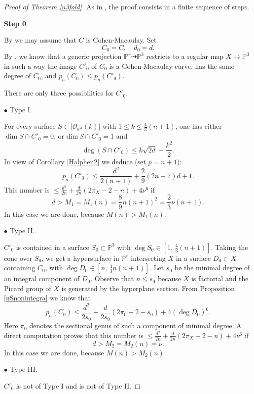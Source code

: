 \documentclass[9pt,a4paper]{amsart}
\theoremstyle{plain}
\theoremstyle{definition}
\theoremstyle{remark}
\begin{document}
\smallskip
\begin{proof}[Proof of Theorem \ref{n3fold}] As in \cite[Proof of Theorem 4.9]{Liu}, the
proof consists in a finite sequence of steps.

\smallskip
{\bf{Step 0}}.

\smallskip
By \cite[Lemma 4.3]{Liu2} we may assume that $C$ is Cohen-Macaulay.
Set
$$
C_0=C, \quad d_0=d.
$$
By \cite[Section 3 and Lemma 3.14]{Liu}, we know that a generic
projection $\mathbb P^r\dasharrow\mathbb P^3$ restricts to a regular
map $X\to \mathbb P^3$ in such a way the image $C'_0$ of $C_0$ is a
Cohen-Macaulay curve, has the same degree of $C_0$, and
$p_a(C_0)\leq p_a(C'_0)$.

\smallskip
There are only three possibilities for $C'_0$.


\smallskip
$\bullet$ Type I.

\smallskip
For every surface $S \in \vert \mathcal{O}_{\mathbb{P}^3}(k) \vert$
with $1\leq k\leq \frac{4}{3}(n+1)$, one has either $\dim S\cap
C'_0=0$, or $\mathrm{dim}\ S\cap C'_0 = 1$ and
$$
\deg(S\cap C'_0) \leq k\sqrt{2d}-\dfrac{k^2}{2}.
$$
In view of  Corollary \ref{Halphen2} we deduce (set $p=n+1$):
$$
p_a(C'_0)\leq \frac{d^2}{2(n+1)}+\frac{2}{9}(2n-7)d+1.
$$
This number is $\leq \frac{d^2}{2n}+\frac{d}{2n}(2\pi_X-2-n)+4\nu^6$
if
$$
d>M_1=M_1(n)=\frac{8}{9}n(n+1)^2=\frac{2}{3}\nu(n+1).
$$
In this case we are done, because $M(n)>M_1(n)$.


\smallskip
$\bullet$ Type II.

\smallskip
$C'_0$ is contained in a surface  $S_0\subset \mathbb P^3$ with
$\deg S_0\in [1,\,\frac{4}{3}(n+1)]$. Taking the cone over $S_0$, we get a hypersurface
in $\mathbb P^r$ intersecting $X$ in a
surface $D_0\subset X$ containing $C_0$, with $\deg D_0\in
[n,\,\frac{4}{3}n(n+1)]$. Let
$s_0$ be the minimal degree of an integral component of $D_0$.
Observe that $n\leq s_0$ because $X$ is factorial and the Picard
group of $X$ is generated by the hyperplane section. From
Proposition \ref{nSnonintegra} we know that
$$
p_a(C_0)\leq \frac{d^2}{2s_0}+\frac{d}{2s_0}(2\pi_0-2-s_0)+4(\deg
D_0)^6.
$$
Here $\pi_0$ denotes the sectional genus of such a component of
minimal degree. A direct computation proves that this number is
$\leq \frac{d^2}{2n}+\frac{d}{2n}(2\pi_X-2-n)+4\nu^6$ if
$$
d>M_2=M_2(n)=\nu.
$$
In this case we are done, because $M(n)>M_2(n)$.


\smallskip
$\bullet$ Type III.

\smallskip
$C'_0$ is not of Type I and is not of Type II.


\end{proof}
\end{document}

